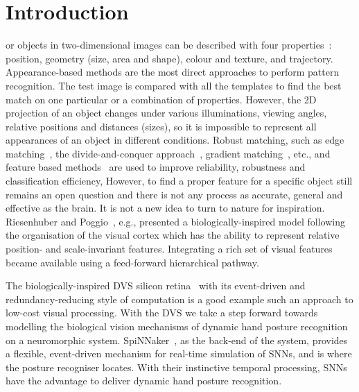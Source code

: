 \documentclass[journal]{journal}
\begin{document}
\section{Introduction}
 or objects in two-dimensional images can be described with four properties~\cite{wysoski2008fast}: position, geometry (size, area and shape), colour and texture, and trajectory. 
Appearance-based methods are the most direct approaches to perform pattern recognition. 
The test image is compared with all the templates to find the best match on one particular or a combination of properties. 
However, the 2D projection of an object changes under various illuminations, viewing angles, relative positions and distances (sizes), so it is impossible to represent all appearances of an object in different conditions. 
Robust matching, such as edge matching~\cite{canny1986computational}, the divide-and-conquer approach~\cite{toygar2004multiple}, gradient matching~\cite{wei2006robust}, etc., and feature based methods~\cite{lowe2004distinctive, bay2008speeded} are used to improve reliability, robustness and classification efficiency, 
However, to find a proper feature for a specific object still remains an open question and there is not any process as accurate, general and effective as the brain.
It is not a new idea to turn to nature for inspiration. 
Riesenhuber and Poggio~\cite{riesenhuber1999hierarchical}, e.g., presented a biologically-inspired model following the organisation of the visual cortex which has the ability to represent relative position- and scale-invariant features. Integrating a rich set of visual features became available using a feed-forward hierarchical pathway. 

The biologically-inspired DVS silicon retina~\cite{lenero20113} with its event-driven and redundancy-reducing style of computation is a good example such an approach to low-cost visual processing. 
With the DVS we take a step forward towards modelling the biological vision mechanisms of dynamic hand posture recognition on a neuromorphic system.
SpiNNaker~\cite{furber2014spinnaker}, as the back-end of the system, provides a flexible, event-driven mechanism for real-time simulation of SNNs, and is where the posture recogniser locates.
With their instinctive temporal processing, SNNs have the advantage to deliver dynamic hand posture recognition.
\end{document}
